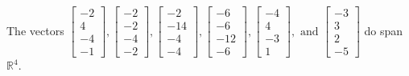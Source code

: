 \begin{exercise}
\begin{exerciseStatement}
  \end{exerciseStatement}
  \begin{exerciseAnswer}
   The vectors \(\left[\begin{array}{r}
-2 \\
4 \\
-4 \\
-1
\end{array}\right] , \left[\begin{array}{r}
-2 \\
-2 \\
-4 \\
-2
\end{array}\right] , \left[\begin{array}{r}
-2 \\
-14 \\
-4 \\
-4
\end{array}\right] , \left[\begin{array}{r}
-6 \\
-6 \\
-12 \\
-6
\end{array}\right] , \left[\begin{array}{r}
-4 \\
4 \\
-3 \\
1
\end{array}\right] , \text{ and } \left[\begin{array}{r}
-3 \\
3 \\
2 \\
-5
\end{array}\right]\) 
  	 do  
	span \(\mathbb{R}^4\).
  


  \end{exerciseAnswer}
\end{exercise}